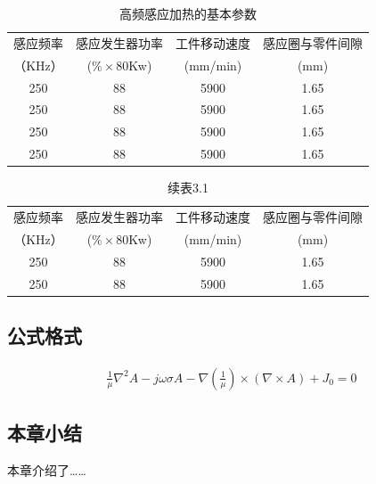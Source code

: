 \documentclass[UTF8,a4paper,12pt]{ctexart}
\numberwithin{equation}{section}
\begin{document}
\begin{table}[htbp]
\centering
\caption{高频感应加热的基本参数}
\small
\begin{tabular}{c c c c}
\toprule
感应频率 &感应发生器功率 & 工件移动速度  &感应圈与零件间隙\\
（KHz）&($\% \times$80Kw) &(mm/min)  &(mm)\\
\midrule
250 &88 &5900 &1.65\\

250 &88 &5900 &1.65\\

250 &88 &5900 &1.65\\

250 &88 &5900 &1.65\\



\bottomrule
\end{tabular}
\end{table}



\begin{table}[htbp]
\centering
\captionsetup{singlelinecheck=off}
\caption*{续表3.1}
\small
\begin{tabular}{c c c c}
\toprule
感应频率 &感应发生器功率 & 工件移动速度  &感应圈与零件间隙\\
（KHz）&($\% \times$80Kw) &(mm/min)  &(mm)\\
\midrule
250 &88 &5900 &1.65\\

250 &88 &5900 &1.65\\
\bottomrule
\end{tabular}
\end{table}
\vspace{\baselineskip}


\subsection{公式格式}


\begin{eqnarray}
\frac{1}{\mu} \nabla^2A - j \omega \sigma A -\nabla(\frac{1}{\mu}) \times(\nabla \times A)+J_0=0
\end{eqnarray}


\subsection{本章小结}
本章介绍了……
\end{document}
